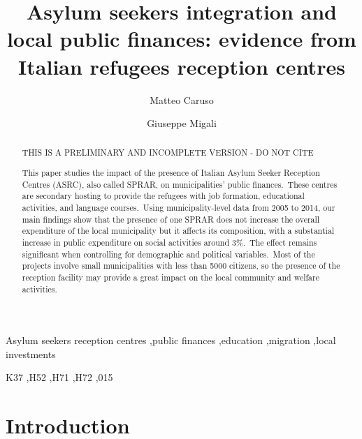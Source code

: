 \documentclass[authoryear,preprint,review,12pt]{elsarticle}
\begin{document}
\begin{frontmatter}


\title{Asylum seekers integration and local public finances: evidence from Italian refugees reception centres}
\author[inst1]{Matteo Caruso}
\author[inst2]{Giuseppe Migali}
 \date{}




\begin{abstract}

 THIS IS A PRELIMINARY AND INCOMPLETE VERSION - DO NOT CITE
 \\
 
 \vspace{10}
 
\noindent
This paper studies the impact of the presence of Italian Asylum Seeker Reception Centres (ASRC), also called SPRAR, on municipalities' public finances.\ These centres are secondary hosting to provide the refugees with job formation, educational activities, and language courses.\ Using municipality-level data from 2005 to 2014, our main findings show that the presence of one SPRAR does not increase the overall expenditure of the local municipality but it affects its composition, with a substantial increase in public expenditure on social activities around 3\%.\ The effect remains significant when controlling for demographic and political variables.\ Most of the projects involve small municipalities with less than 5000 citizens, so the presence of the reception facility may provide a great impact on the local community and welfare activities.\\ 
\end{abstract}


\begin{keyword}
Asylum seekers reception centres \sep public finances \sep education \sep migration \sep local investments

\JEL K37 \sep H52 \sep H71 \sep H72 \sep 015
\end{keyword}



\end{frontmatter}

\section{Introduction}
\end{document}
